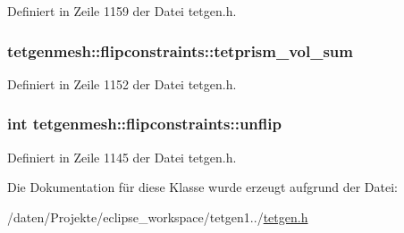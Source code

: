 Definiert in Zeile 1159 der Datei tetgen.\-h.

\hypertarget{classtetgenmesh_1_1flipconstraints_a8bb8c96375bd68188384dd8cb34e0a28}{
\subsubsection[{tetprism\-\_\-vol\-\_\-sum}]{ tetgenmesh\-::flipconstraints\-::tetprism\-\_\-vol\-\_\-sum}}\label{classtetgenmesh_1_1flipconstraints_a8bb8c96375bd68188384dd8cb34e0a28}


Definiert in Zeile 1152 der Datei tetgen.\-h.

\hypertarget{classtetgenmesh_1_1flipconstraints_aaa71c48602e685babeca9669f8921b10}{
\subsubsection[{unflip}]{\setlength{\rightskip}{0pt plus 5cm}int tetgenmesh\-::flipconstraints\-::unflip}}\label{classtetgenmesh_1_1flipconstraints_aaa71c48602e685babeca9669f8921b10}


Definiert in Zeile 1145 der Datei tetgen.\-h.



Die Dokumentation für diese Klasse wurde erzeugt aufgrund der Datei\-:\begin{DoxyCompactItemize}
\item 
/daten/\-Projekte/eclipse\-\_\-workspace/tetgen1../\hyperlink{tetgen_8h}{tetgen.\-h}\end{DoxyCompactItemize}
